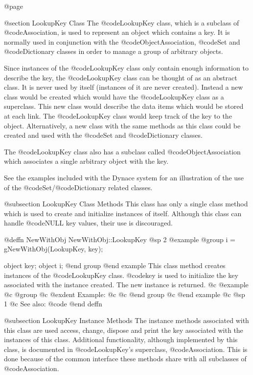 @page

@section LookupKey Class
The @code{LookupKey} class, which is a subclass of @code{Association},
is used to represent an object which contains a key.  It is normally
used in conjunction with the @code{ObjectAssociation}, @code{Set} and
@code{Dictionary} classes in order to manage a group of arbitrary
objects.

Since instances of the @code{LookupKey} class only contain enough
information to describe the key, the @code{LookupKey} class can be
thought of as an abstract class.  It is never used by itself (instances
of it are never created).  Instead a new class would be created which
would have the @code{LookupKey} class as a superclass.  This new class
would describe the data items which would be stored at each link.  The
@code{LookupKey} class would keep track of the key to the object.
Alternatively, a new class with the same methods as this class could be
created and used with the @code{Set} and @code{Dictionary} classes.

The @code{LookupKey} class also has a subclass called
@code{ObjectAssociation} which associates a single arbitrary object with
the key.

See the examples included with the Dynace system for an illustration of the
use of the @code{Set}/@code{Dictionary} related classes.



@subsection LookupKey Class Methods
This class has only a single class method which is used to create and
initialize instances of itself.   Although this class can handle
@code{NULL} key values, their use is discouraged.






@deffn {NewWithObj} NewWithObj::LookupKey
@sp 2
@example
@group
i = gNewWithObj(LookupKey, key);

object  key;
object  i;
@end group
@end example
This class method creates instances of the @code{LookupKey} class.
@code{key} is used to initialize the key associated with the instance
created.  The new instance is returned.
@c @example
@c @group
@c @exdent Example:
@c 
@c @end group
@c @end example
@c @sp 1
@c See also:  @code{}
@end deffn




@subsection LookupKey Instance Methods
The instance methods associated with this class are used access, change,
dispose and print the key associated with the instances of this class.
Additional functionality, although implemented by this class, is documented
in @code{LookupKey}'s superclass, @code{Association}.  This is done
because of the common interface these methods share with all subclasses
of @code{Association}.







